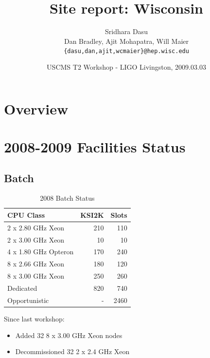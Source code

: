 \documentclass{beamer}
\title{Site report: Wisconsin}
\author[Maier]{
    Sridhara Dasu \\
    Dan Bradley, Ajit Mohapatra, Will Maier
    {\tt \{dasu,dan,ajit,wcmaier\}@hep.wisc.edu}}
\institute[Wisconsin]{University of Wisconsin - High Energy Physics}
\date[2009.03.03]{USCMS T2 Workshop - LIGO Livingston, 2009.03.03}
\begin{document}

\begin{frame}
    \titlepage
\end{frame}

\section{Overview}
\begin{frame}
    \tableofcontents
\end{frame}

\section{2008-2009 Facilities Status}
\subsection{Batch}
\begin{frame}
\begin{table}
\begin{tabular}{lrr}
    \toprule
    CPU Class               &   KSI2K   &   Slots \\
    \midrule
    2 x 2.80 GHz Xeon       &   210     &   110 \\  %
    2 x 3.00 GHz Xeon       &   10      &   10 \\   %
    4 x 1.80 GHz Opteron    &   170     &   240 \\  %
    8 x 2.66 GHz Xeon       &   180     &   120 \\  %
    8 x 3.00 GHz Xeon       &   250     &   260 \\  %
    \midrule
    Dedicated               &   820     &   740 \\
    Opportunistic           &   -       &   2460 \\
    \bottomrule
\end{tabular}
\caption{2008 Batch Status}
\label{2008_batch_status}
\end{table}

Since last workshop:
\begin{itemize}
    \item Added 32 8 x 3.00 GHz Xeon nodes
    \item Decommissioned 32 2 x 2.4 GHz Xeon
\end{itemize}
\end{frame}
\end{document}

